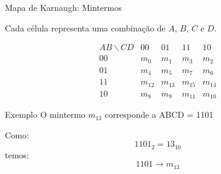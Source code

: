 \begin{frame}{Mapa de Karnaugh: Mintermos}
    \small

    Cada célula representa uma combinação de $A$, $B$, $C$ e $D$.

    \[
    \begin{array}{c|cccc}
        AB\backslash CD
        & 00 & 01 & 11 & 10 \\ \hline

        00
        & m_0 & m_1 & m_3 & m_2 \\

        01
        & m_4 & m_5 & m_7 & m_6 \\

        11
        & m_{12} & m_{13} & m_{15} & m_{14} \\

        10
        & m_8 & m_9 & m_{11} & m_{10}
    \end{array}
    \]

    \begin{block}{Exemplo}
        O mintermo $m_{13}$ corresponde a ABCD = 1101

        Como:
        \[
            1101_2 = 13_{10}
        \]
        temos:
        \[
            \boxed{1101 \rightarrow m_{13}}
        \]
    \end{block}

\end{frame}